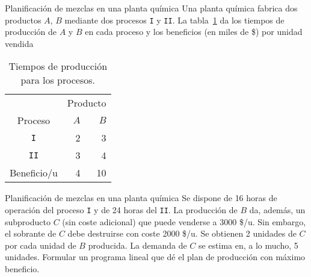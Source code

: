 \documentclass[../../main.tex]{subfiles}
\begin{document}
\begin{frame}{Planificación de mezclas en una planta química}{}
  Una planta química fabrica dos productos $A$, $B$ mediante dos procesos \texttt{I} y \texttt{II}. La tabla~\ref{tab:processing-times} da los tiempos de producción de $A$ y $B$ en cada proceso y los beneficios (en miles de \$) por unidad vendida

  
  \begin{table}
    \caption{Tiempos de producción para los procesos.\label{tab:processing-times}}
    \centering
    \begin{tabular}[h]{crr}
      \toprule
      &\multicolumn{2}{c}{Producto}\\
      \cmidrule{2-3}
      Proceso & $A$&$B$\\
      \midrule
      \texttt{I}&2&3\\
      \texttt{II}&3&4\\
      Beneficio/u&4&10\\
      \bottomrule      
    \end{tabular}        
  \end{table}    
\end{frame}

\begin{frame}{Planificación de mezclas en una planta química}{}
  Se dispone de 16 horas de operación del proceso \texttt{I} y de 24 horas del \texttt{II}. La producción de $B$ da, además, un subproducto $C$ (sin coste adicional) que puede venderse a 3000 \$/u. Sin embargo, el sobrante de $C$ debe destruirse con coste 2000 \$/u. Se obtienen 2 unidades de $C$ por cada unidad de $B$ producida. La demanda de $C$ se estima en, a lo mucho, 5 unidades. Formular un programa lineal que dé el plan de producción con máximo beneficio.
\end{frame}
\end{document}
